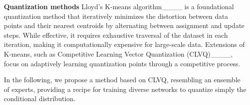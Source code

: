 \textbf{Quantization methods}
Lloyd's K-means algorithm____ is a foundational quantization method that iteratively minimizes the distortion between data points and their nearest centroids by alternating between assignment and update steps. While effective, it requires exhaustive traversal of the dataset in each iteration, making it computationally expensive for large-scale data. Extensions of K-means, such as Competitive Learning Vector Quantization (CLVQ)____, focus on adaptively learning quantization points through a competitive process.

In the following, we propose a method based on CLVQ, resembling an ensemble of experts, providing a recipe for training diverse networks to quantize simply the conditional distribution.